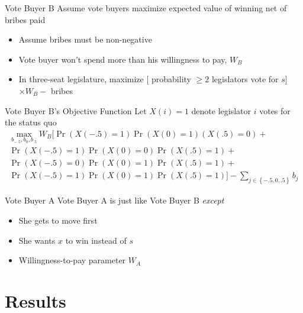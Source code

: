 \documentclass[handout]{beamer}
\begin{document}
\begin{frame}{Vote Buyer B}
\pause
Assume vote buyers maximize expected value of winning net of bribes paid  
\pause
\begin{itemize}[<+->]
	\item Assume bribes must be non-negative
	\item Vote buyer won't spend more than his willingness to pay, $W_B$
	\item In three-seat legislature, maximize $[$ probability $\geq 2$ legislators vote for $s ]$ $\times W_B -$ bribes
\end{itemize}
\end{frame}

\begin{frame}{Vote Buyer B's Objective Function}
\pause
Let $X(i) = 1$ denote legislator $i$ votes for the status quo
\pause
\begin{multline*}
			    \max_{b_{-.5}, b_0, b_{.5}} 
					W_B \biggl[ \Pr\left(X\left(-.5\right)=1\right)\Pr\left(X\left(0\right)=1\right)\left(X\left(.5\right)=0\right)  + \\
					\Pr\left(X\left(-.5\right)=1\right)\Pr\left(X\left(0\right)=0\right)\Pr\left(X\left(.5\right)=1\right) + \\
					\Pr\left(X\left(-.5\right)=0\right)\Pr\left(X\left(0\right)=1\right)\Pr\left(X\left(.5\right)=1\right) + \\
					\Pr\left(X\left(-.5\right)=1\right)\Pr\left(X\left(0\right)=1\right)\Pr\left(X\left(.5\right)=1\right) \biggr] - \sum_{j\in \left\{-.5, 0,.5\right\}} b_j
				\end{multline*}
\end{frame}


\begin{frame}{Vote Buyer A}
\pause
Vote Buyer A is just like Vote Buyer B \textit{except}
\pause
\begin{itemize}[<+->]
	\item She gets to move first
	\item She wants $x$ to win instead of $s$
	\item Willingness-to-pay parameter $W_A$
\end{itemize}
\end{frame}





\section{Results}
\end{document}
